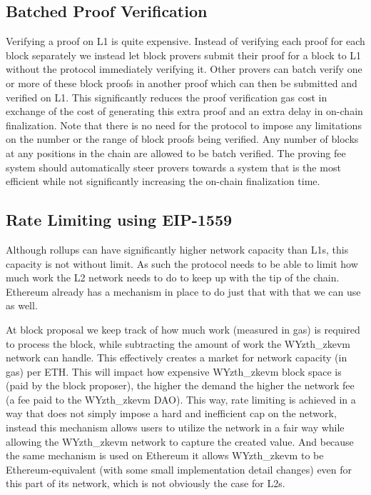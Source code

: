 \documentclass[9pt,oneside]{amsart}
\begin{document}
\begin{multicols}{2}
\subsection{Batched Proof Verification}\label{sec:proof-opt}
Verifying a proof on L1 is quite expensive. Instead of verifying each proof for each block separately we instead let block provers submit their proof for a block to L1 without the protocol immediately verifying it. Other provers can batch verify one or more of these block proofs in another proof which can then be submitted and verified on L1. This significantly reduces the proof verification gas cost in exchange of the cost of generating this extra proof and an extra delay in on-chain finalization. Note that there is no need for the protocol to impose any limitations on the number or the range of block proofs being verified. Any number of blocks at any positions in the chain are allowed to be batch verified. The proving fee system should automatically steer provers towards a system that is the most efficient while not significantly increasing the on-chain finalization time.

\subsection{Rate Limiting using EIP-1559}\label{sec:eip1559-propose}
Although rollups can have significantly higher network capacity than L1s, this capacity is not without limit. As such the protocol needs to be able to limit how much work the L2 network needs to do to keep up with the tip of the chain. Ethereum already has a mechanism in place to do just that with \cite{eip1559} that we can use as well. 

At block proposal we keep track of how much work (measured in gas) is required to process the block, while subtracting the amount of work the WYzth_zkevm network can handle. This effectively creates a market for network capacity (in gas) per ETH. This will impact how expensive WYzth_zkevm block space is (paid by the block proposer), the higher the demand the higher the network fee (a fee paid to the WYzth_zkevm DAO). This way, rate limiting is achieved in a way that does not simply impose a hard and inefficient cap on the network, instead this mechanism allows users to utilize the network in a fair way while allowing the WYzth_zkevm network to capture the created value. And because the same mechanism is used on Ethereum it allows WYzth_zkevm to be Ethereum-equivalent (with some small implementation detail changes) even for this part of its network, which is not obviously the case for L2s.


\end{multicols}
\end{document}
